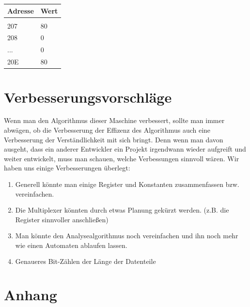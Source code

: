 \documentclass[12pt,titlepage]{article}
\begin{document}
\begin{table}[h!]
    \begin{tabular}{l|l}
    Adresse & Wert            \\
    \hline                    \\
    207   & 80       \\
    208   & 0        \\
    ...   & 0        \\
    20E   & 80       \\
    \end{tabular}
\end{table}

\newpage

\section{Verbesserungsvorschläge} 
Wenn man den Algorithmus dieser Maschine verbessert, sollte man immer abw{\"a}gen, ob die Verbesserung der Effizenz des Algorithmus auch eine Verbesserung der Verst{\"a}ndlichkeit mit sich bringt. Denn wenn man davon ausgeht, dass ein anderer Entwickler ein Projekt irgendwann wieder aufgreift und weiter entwickelt, muss man schauen, welche Verbessungen sinnvoll w{\"a}ren. 
Wir haben uns einige Verbesserungen überlegt: 
\begin{enumerate} 
\item Generell könnte man einige Register und Konstanten zusammenfassen bzw. vereinfachen.
\item Die Multiplexer könnten durch etwas Planung gekürzt werden. (z.B. die Register sinnvoller anschließen)
\item Man könnte den Analysealgorithmus noch vereinfachen und ihn noch mehr wie einen Automaten ablaufen lassen.
\item Genaueres Bit-Zählen der Länge der Datenteile
\end{enumerate}

\section{Anhang}
\end{document}
